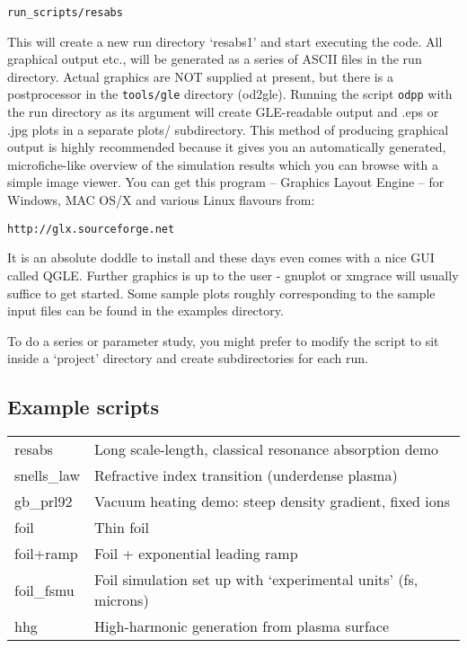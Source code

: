 \documentclass[11pt]{article}
\begin{document}
\begin{verbatim}
run_scripts/resabs
\end{verbatim}	
	
This will create a new run directory `resabs1' and start executing the code.
All graphical output etc., will be generated as a series of ASCII files
in the run directory.  Actual graphics are NOT supplied at present,
but there is a postprocessor in the \texttt{tools/gle} directory (od2gle). 
Running the script \texttt{odpp} with the run directory as its argument will create GLE-readable output and .eps or .jpg plots in a separate plots/ subdirectory.
This method of producing graphical output is highly recommended because it gives you an automatically generated, microfiche-like overview
 of the simulation results which you can browse with a simple image viewer.  You can get this program -- Graphics Layout Engine -- for Windows, MAC OS/X and various Linux flavours from:

\begin{verbatim}
http://glx.sourceforge.net
\end{verbatim}

It is an absolute doddle to install and these days even comes with a nice GUI called QGLE.  Further graphics is up to the user - gnuplot or xmgrace will usually 
suffice to get started.  
Some sample plots roughly corresponding to the sample input 
files can be found in the examples directory.

To do a series or parameter study, you might prefer to modify the
script to sit inside a `project' directory and create subdirectories for 
each run.

\subsection{Example scripts}\label{scripts}

\begin{tabular}{ll}
resabs	&	Long scale-length, classical resonance absorption demo\\
snells\_law &	Refractive index transition (underdense plasma)\\
gb\_prl92 &	Vacuum heating demo: steep density gradient, fixed ions\\
foil	&	Thin foil\\
foil+ramp &	Foil + exponential leading ramp\\
foil\_fsmu & 	Foil simulation set up with `experimental units' (fs, microns)\\
hhg	&	High-harmonic generation from plasma surface
\end{tabular}	
\end{document}
